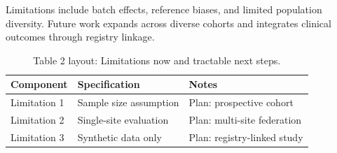 
Limitations include batch effects, reference biases, and limited population diversity. Future work expands across diverse cohorts and integrates clinical outcomes through registry linkage.

\begin{table}[H]
\caption{Table 2 layout: Limitations now and tractable next steps.}
\label{tab:limits_future}
\centering
\begin{tabular}{>{\raggedright\arraybackslash}p{3.4cm} >{\raggedright\arraybackslash}p{4.6cm} >{\raggedright\arraybackslash}p{5.4cm}}
\toprule
\textbf{Component} & \textbf{Specification} & \textbf{Notes} \\
\midrule
  Limitation 1 & Sample size assumption & Plan: prospective cohort \\
  Limitation 2 & Single-site evaluation & Plan: multi-site federation \\
  Limitation 3 & Synthetic data only & Plan: registry-linked study \\
\bottomrule
\end{tabular}
\end{table}
